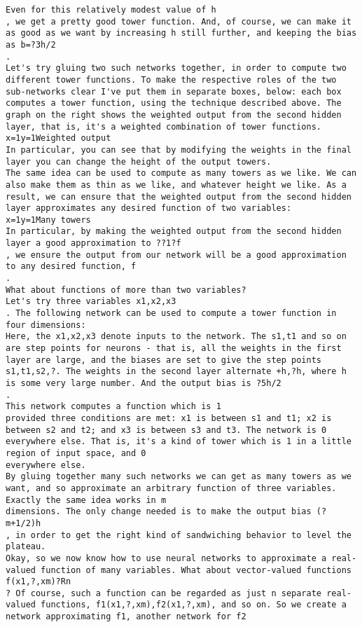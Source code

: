 \begin{lstlisting}
Even for this relatively modest value of h
, we get a pretty good tower function. And, of course, we can make it as good as we want by increasing h still further, and keeping the bias as b=?3h/2
.
Let's try gluing two such networks together, in order to compute two different tower functions. To make the respective roles of the two sub-networks clear I've put them in separate boxes, below: each box computes a tower function, using the technique described above. The graph on the right shows the weighted output from the second hidden layer, that is, it's a weighted combination of tower functions.
x=1y=1Weighted output
In particular, you can see that by modifying the weights in the final layer you can change the height of the output towers.
The same idea can be used to compute as many towers as we like. We can also make them as thin as we like, and whatever height we like. As a result, we can ensure that the weighted output from the second hidden layer approximates any desired function of two variables:
x=1y=1Many towers 
In particular, by making the weighted output from the second hidden layer a good approximation to ??1?f
, we ensure the output from our network will be a good approximation to any desired function, f
.
What about functions of more than two variables?
Let's try three variables x1,x2,x3
. The following network can be used to compute a tower function in four dimensions:
Here, the x1,x2,x3 denote inputs to the network. The s1,t1 and so on are step points for neurons - that is, all the weights in the first layer are large, and the biases are set to give the step points s1,t1,s2,?. The weights in the second layer alternate +h,?h, where h is some very large number. And the output bias is ?5h/2
.
This network computes a function which is 1
provided three conditions are met: x1 is between s1 and t1; x2 is between s2 and t2; and x3 is between s3 and t3. The network is 0 everywhere else. That is, it's a kind of tower which is 1 in a little region of input space, and 0
everywhere else.
By gluing together many such networks we can get as many towers as we want, and so approximate an arbitrary function of three variables. Exactly the same idea works in m
dimensions. The only change needed is to make the output bias (?m+1/2)h
, in order to get the right kind of sandwiching behavior to level the plateau.
Okay, so we now know how to use neural networks to approximate a real-valued function of many variables. What about vector-valued functions f(x1,?,xm)?Rn
? Of course, such a function can be regarded as just n separate real-valued functions, f1(x1,?,xm),f2(x1,?,xm), and so on. So we create a network approximating f1, another network for f2

\end{lstlisting}
